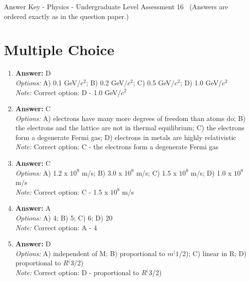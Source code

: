\documentclass[12pt]{article}
\begin{document}
\begin{center}
Answer Key - Physics - Undergraduate Level Assessment 16 \
\small (Answers are ordered exactly as in the question paper.)
\end{center}

\section*{Multiple Choice}
\begin{enumerate}[label=\arabic*.]
\item \textbf{Answer:} D
\\ \textit{Options:} A) 0.1 GeV/$c^2$; B) 0.2 GeV/$c^2$; C) 0.5 GeV/$c^2$; D) 1.0 GeV/$c^2$
\\ \textit{Note:} Correct option: D - 1.0 GeV/$c^2$
\item \textbf{Answer:} C
\\ \textit{Options:} A) electrons have many more degrees of freedom than atoms do; B) the electrons and the lattice are not in thermal equilibrium; C) the electrons form a degenerate Fermi gas; D) electrons in metals are highly relativistic
\\ \textit{Note:} Correct option: C - the electrons form a degenerate Fermi gas
\item \textbf{Answer:} C
\\ \textit{Options:} A) 1.2 x $10^9$ m/s; B) 3.0 x $10^8$ m/s; C) 1.5 x $10^8$ m/s; D) 1.0 x $10^8$ m/s
\\ \textit{Note:} Correct option: C - 1.5 x $10^8$ m/s
\item \textbf{Answer:} A
\\ \textit{Options:} A) 4; B) 5; C) 6; D) 20
\\ \textit{Note:} Correct option: A - 4
\item \textbf{Answer:} D
\\ \textit{Options:} A) independent of M; B) proportional to $m^(1$/2); C) linear in R; D) proportional to $R^(3$/2)
\\ \textit{Note:} Correct option: D - proportional to $R^(3$/2)
\end{enumerate}
\end{document}
